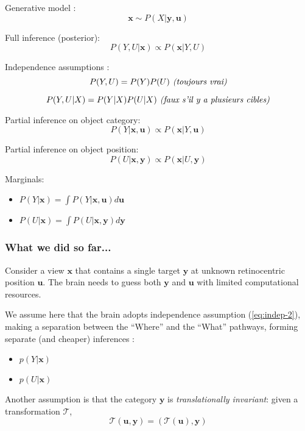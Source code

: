 Generative model :
$$ \boldsymbol{x} \sim P(X|\boldsymbol{y}, \boldsymbol{u}) $$

Full inference (posterior):
$$ P(Y, U|\boldsymbol{x}) \propto  P(\boldsymbol{x}|Y, U) $$

Independence assumptions :
\begin{equation}
P(Y, U) = P(Y)  P(U) \text{\emph{ (toujours vrai)}}
\label{eq:indep-1}
\end{equation}

\begin{equation}
P(Y, U|X) = P(Y|X)  P(U|X) \text{\emph{ (faux s'il y a plusieurs cibles)}}
\label{eq:indep-2}
\end{equation}

Partial inference on object category:
$$ P(Y|\boldsymbol{x}, \boldsymbol{u}) \propto  P(\boldsymbol{x}|Y, \boldsymbol{u}) $$

Partial inference on object position:
$$ P(U|\boldsymbol{x}, \boldsymbol{y}) \propto  P(\boldsymbol{x}|U, \boldsymbol{y}) $$

Marginals:
\begin{itemize}
\item $ P(Y|\boldsymbol{x}) = \int P(Y|\boldsymbol{x}, \boldsymbol{u}) d\boldsymbol{u}$
\item $ P(U|\boldsymbol{x}) = \int P(U|\boldsymbol{x}, \boldsymbol{y}) d\boldsymbol{y}$
\end{itemize}

\subsubsection{What we did so far...}

Consider a view $\boldsymbol{x}$ that contains a single target $\boldsymbol{y}$ at unknown retinocentric position $\boldsymbol{u}$. The brain needs to guess both  $\boldsymbol{y}$ and $\boldsymbol{u}$ with limited computational resources.

We assume here that the brain adopts independence assumption (\ref{eq:indep-2}), making a separation between the ``Where'' and the ``What'' pathways, forming separate (and cheaper) inferences :
\begin{itemize}
\item $p(Y|\boldsymbol{x})$
\item $p(U|\boldsymbol{x})$
\end{itemize}

Another assumption is that the category $\boldsymbol{y}$ is \emph{translationally invariant}: given a transformation $\mathcal{T}$,
$$\mathcal{T}(\boldsymbol{u}, \boldsymbol{y})
= (\mathcal{T}(\boldsymbol{u}), \boldsymbol{y})$$

